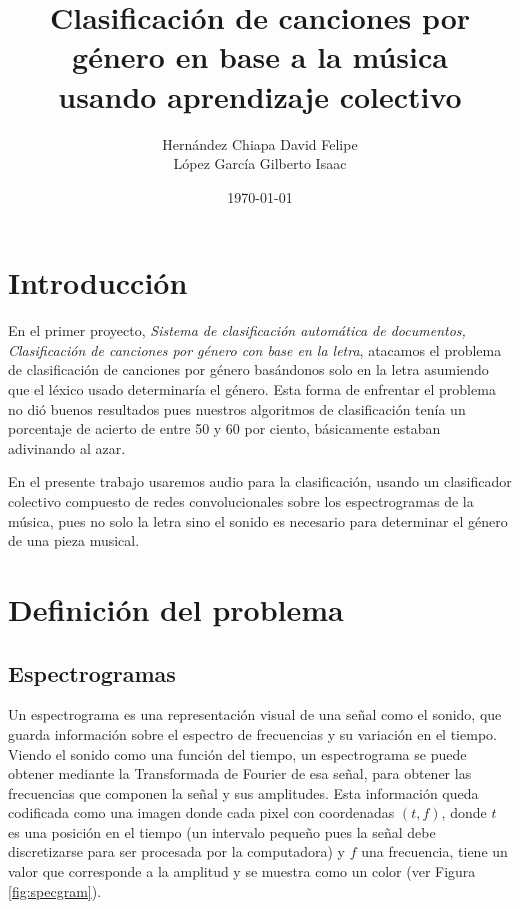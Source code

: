 \documentclass[spanish,11pt,letterpaper]{article}
\title{Clasificación de canciones por género en base a la música\\
usando aprendizaje colectivo}
\author{Hernández Chiapa David Felipe\\
López García Gilberto Isaac}
\affil{Facultad de Ciencias\\{\small Universidad Nacional Autónoma de México}}
\date{\small\today}
\begin{document}
\maketitle

\section{Introducción}

En el primer proyecto, \textit{Sistema de clasificación automática de documentos,
Clasificación de canciones por género con base en la letra}, atacamos el problema
de clasificación de canciones por género basándonos solo en la letra
asumiendo que el léxico usado determinaría el género. Esta
forma de enfrentar el problema no dió buenos resultados pues nuestros algoritmos
de clasificación tenía un porcentaje de acierto de entre 50 y 60 por ciento,
básicamente estaban adivinando al azar.

En el presente trabajo usaremos audio para la clasificación, usando un clasificador
colectivo compuesto de redes convolucionales sobre los espectrogramas de la música,
pues no solo la letra sino el sonido es necesario para determinar el género de
una pieza musical.

\section{Definición del problema}

\subsection{Espectrogramas}

Un espectrograma es una representación visual de una señal como el sonido, que
guarda información sobre el espectro de frecuencias y su variación en el tiempo.
Viendo el sonido como una función del tiempo, un espectrograma se puede obtener
mediante la Transformada de Fourier de esa señal, para obtener las frecuencias
que componen la señal y sus amplitudes. Esta información queda codificada como una
imagen donde cada pixel con coordenadas $(t,f)$, donde $t$ es una posición en el
tiempo (un intervalo pequeño pues la señal debe discretizarse para ser procesada
por la computadora) y $f$ una frecuencia, tiene un valor que corresponde a la
amplitud y se muestra como un color (ver Figura \ref{fig:specgram}).
\end{document}
